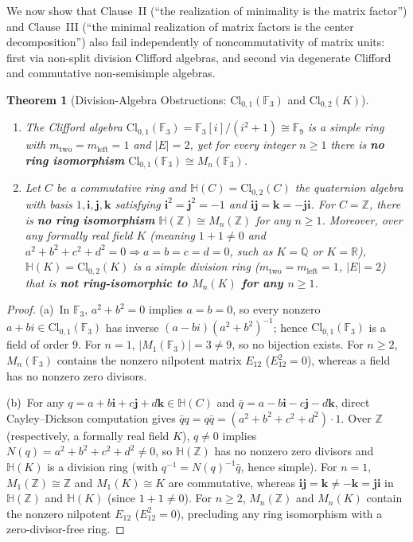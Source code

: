 \documentclass[11pt]{article}
\newtheorem{theorem}{Theorem}[section]
\theoremstyle{definition}
\newcommand{\Cl}{\mathrm{Cl}}
\newcommand{\Mat}{M}
\newcommand{\F}{\mathbb{F}}
\newcommand{\Z}{\mathbb{Z}}
\newcommand{\Q}{\mathbb{Q}}
\newcommand{\R}{\mathbb{R}}
\newcommand{\HH}{\mathbb{H}}
\begin{document}
We now show that Clause~II (``the realization of minimality is the matrix
factor'') and Clause~III (``the minimal realization of matrix factors is the
center decomposition'') also fail independently of noncommutativity of matrix
units: first via non-split division Clifford algebras, and second via degenerate
Clifford and commutative non-semisimple algebras.

\begin{theorem}[Division-Algebra Obstructions: $\Cl_{0,1}(\F_3)$ and $\Cl_{0,2}(K)$]
\label{thm:division-obstruction}
\begin{enumerate}
\item[(a)] The Clifford algebra $\Cl_{0,1}(\F_3) = \F_3[i]/(i^2 + 1) \cong \F_9$ is a
simple ring with $m_{\mathrm{two}} = m_{\mathrm{left}} = 1$ and $|E| = 2$, yet
for every integer $n \ge 1$ there is \textbf{no ring isomorphism}
$\Cl_{0,1}(\F_3) \cong \Mat_n(\F_3)$.
\item[(b)] Let $C$ be a commutative ring and $\HH(C) = \Cl_{0,2}(C)$ the quaternion
algebra with basis $1, \mathbf{i}, \mathbf{j}, \mathbf{k}$ satisfying
$\mathbf{i}^2 = \mathbf{j}^2 = -1$ and $\mathbf{i}\mathbf{j} = \mathbf{k} =
-\mathbf{j}\mathbf{i}$. For $C = \Z$, there is \textbf{no ring isomorphism}
$\HH(\Z) \cong \Mat_n(\Z)$ for any $n \ge 1$. Moreover, over any formally real
field $K$ (meaning $1 + 1 \neq 0$ and $a^2 + b^2 + c^2 + d^2 = 0 \Rightarrow
a = b = c = d = 0$, such as $K = \Q$ or $K = \R$), $\HH(K) = \Cl_{0,2}(K)$ is a
simple division ring ($m_{\mathrm{two}} = m_{\mathrm{left}} = 1$, $|E| = 2$)
that is \textbf{not ring-isomorphic to $\Mat_n(K)$ for any $n \ge 1$}.
\end{enumerate}
\end{theorem}

\begin{proof}
(a)~In $\F_3$, $a^2 + b^2 = 0$ implies $a = b = 0$, so every nonzero $a + bi \in
\Cl_{0,1}(\F_3)$ has inverse $(a - bi)(a^2 + b^2)^{-1}$; hence $\Cl_{0,1}(\F_3)$
is a field of order $9$. For $n = 1$, $|\Mat_1(\F_3)| = 3 \neq 9$, so no
bijection exists. For $n \ge 2$, $\Mat_n(\F_3)$ contains the nonzero nilpotent
matrix $E_{12}$ ($E_{12}^2 = 0$), whereas a field has no nonzero zero divisors.

(b)~For any $q = a + b\mathbf{i} + c\mathbf{j} + d\mathbf{k} \in \HH(C)$ and
$\bar{q} = a - b\mathbf{i} - c\mathbf{j} - d\mathbf{k}$, direct Cayley--Dickson
computation gives $\bar{q}q = q\bar{q} = (a^2 + b^2 + c^2 + d^2) \cdot 1$.
Over $\Z$ (respectively, a formally real field $K$), $q \neq 0$ implies
$N(q) = a^2 + b^2 + c^2 + d^2 \neq 0$, so $\HH(\Z)$ has no nonzero zero divisors
and $\HH(K)$ is a division ring (with $q^{-1} = N(q)^{-1}\bar{q}$, hence simple).
For $n = 1$, $\Mat_1(\Z) \cong \Z$ and $\Mat_1(K) \cong K$ are commutative,
whereas $\mathbf{i}\mathbf{j} = \mathbf{k} \neq -\mathbf{k} = \mathbf{j}\mathbf{i}$
in $\HH(\Z)$ and $\HH(K)$ (since $1 + 1 \neq 0$). For $n \ge 2$, $\Mat_n(\Z)$
and $\Mat_n(K)$ contain the nonzero nilpotent $E_{12}$ ($E_{12}^2 = 0$),
precluding any ring isomorphism with a zero-divisor-free ring.
\end{proof}
\end{document}
